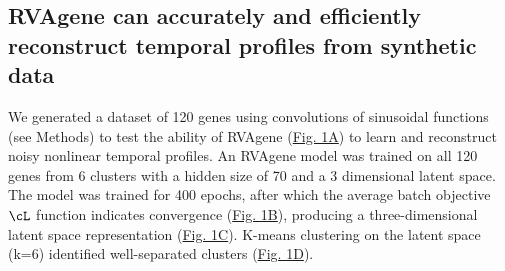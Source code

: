 
\subsection{RVAgene can accurately and efficiently reconstruct temporal profiles from synthetic data}
We generated a dataset of 120 genes using convolutions of sinusoidal functions (see Methods) to test the ability of RVAgene (\hyperref[fig:fig2]{Fig. 1A}) to learn and reconstruct noisy nonlinear temporal profiles. An RVAgene model was trained on all 120 genes from 6 clusters with a hidden size of 70 and a 3 dimensional latent space. The model was trained for 400 epochs, after which the average batch objective $\cL$ function indicates convergence (\hyperref[fig:fig2]{Fig. 1B}), producing a three-dimensional latent space representation (\hyperref[fig:fig2]{Fig. 1C}). K-means clustering on the latent space (k=6) identified well-separated clusters (\hyperref[fig:fig2]{Fig. 1D}).


